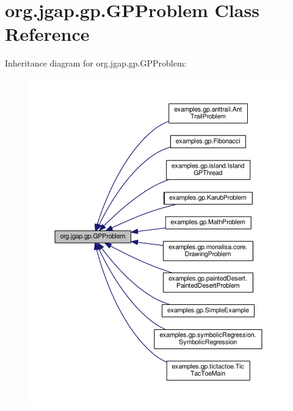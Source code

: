 \hypertarget{classorg_1_1jgap_1_1gp_1_1_g_p_problem}{\section{org.\-jgap.\-gp.\-G\-P\-Problem Class Reference}
\label{classorg_1_1jgap_1_1gp_1_1_g_p_problem}
}


Inheritance diagram for org.\-jgap.\-gp.\-G\-P\-Problem\-:
\nopagebreak
\begin{figure}[H]
\begin{center}
\leavevmode
\includegraphics[width=350pt]{classorg_1_1jgap_1_1gp_1_1_g_p_problem__inherit__graph}
\end{center}
\end{figure}
